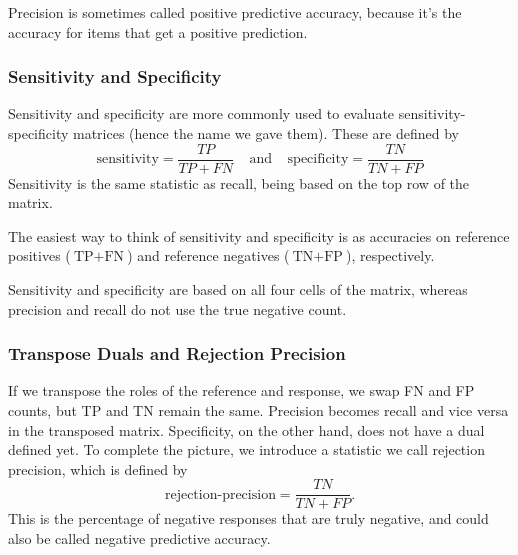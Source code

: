 Precision is sometimes called positive predictive accuracy, because
it's the accuracy for items that get a positive prediction.

\subsubsection{Sensitivity and Specificity}

Sensitivity and specificity are more commonly used to evaluate
sensitivity-specificity matrices (hence the name we gave them). 
These are defined by 
%
\begin{equation}
\mbox{sensitivity} = \frac{TP}{TP+FN}
\ \ \ \ \ \mbox{and} \ \ \ \ \ 
\mbox{specificity} = \frac{TN}{TN+FP}
\end{equation}
%
Sensitivity is the same statistic as recall, being based on the top
row of the matrix.  

The easiest way to think of sensitivity and specificity is as
accuracies on reference positives ($\mbox{TP}+\mbox{FN}$) and
reference negatives ($\mbox{TN}+\mbox{FP}$), respectively.

Sensitivity and specificity are based on all four cells of the matrix,
whereas precision and recall do not use the true negative count.

\subsubsection{Transpose Duals and Rejection Precision}

If we transpose the roles of the reference and response, we swap FN
and FP counts, but TP and TN remain the same.  Precision becomes
recall and vice versa in the transposed matrix.  Specificity, on
the other hand, does not have a dual defined yet.  To complete the
picture, we introduce a statistic we call rejection precision,
which is defined by
%
\begin{equation}
\mbox{rejection-precision}
= \frac{TN}{TN+FP}.
\end{equation}
%
This is the percentage of negative responses that are truly negative,
and could also be called negative predictive accuracy.  

